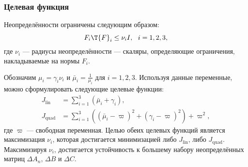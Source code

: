 \begin{frame}
	\frametitle{Целевая функция}
	Неопределённости ограничены следующим образом:
	\begin{equation}
		{F}_i\T{F}_i\leq \nu_i {I}, \ \ i=1,2,3,
	\end{equation}
	где $\nu_i$ --- радиусы неопределённости --- скаляры, определяющие ограничения, накладываемые на нормы ${F}_i$. 
	
	Обозначим $\mu_i=\gamma_i\nu_i$ и $\bar{\mu}_i=\frac{1}{\mu_i}$ для $i=1,2,3$.
	Используя данные переменные, можно сформулировать следующие целевые функции:
	\begin{align}
		\label{eq:cost_lin}
		J_\text{lin} &= \sum_{i=1}^{3}\left(\bar{\mu}_i+\gamma_i\right), \\ 
		\label{eq:cost_quad}
		J_\text{quad} & =  \sum_{i=1}^{3}\left((\bar{\mu}_i-\varpi)^2+(\gamma_i-\varpi)^2\right) + \varpi^2,
	\end{align}
	где $\varpi$ --- свободная переменная. Целью обеих целевых функций является максимизация $\nu_i$, которая достигается минимизацией либо $J_\text{lin}$, либо $J_\text{quad}$. Максимизируя $\nu_i$, достигается устойчивость к большему набору неопределённых матриц $\Delta {A}_n$, $\Delta {B}$ и $\Delta {C}$.
\end{frame}

